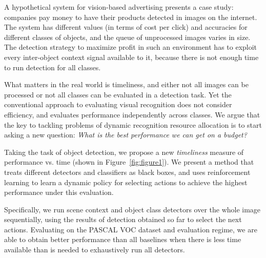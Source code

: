 A hypothetical system for vision-based advertising presents a case study: companies pay money to have their products detected in images on the internet.
The system has different values (in terms of cost per click) and accuracies for different classes of objects, and the queue of unprocessed images varies in size.
The detection strategy to maximize profit in such an environment has to exploit every inter-object context signal available to it, because there is not enough time to run detection for all classes.

What matters in the real world is timeliness, and either not all images can be processed or not all classes can be evaluated in a detection task.
Yet the conventional approach to evaluating visual recognition does not consider efficiency, and evaluates performance independently across classes.
We argue that the key to tackling problems of dynamic recognition resource allocation is to start asking a new question:
\emph{What is the best performance we can get on a budget?}

Taking the task of object detection, we propose a new \emph{timeliness} measure of performance vs. time (shown in Figure~\ref{fig:figure1}).
We present a method that treats different detectors and classifiers as black boxes, and uses reinforcement learning to learn a dynamic policy for selecting actions to achieve the highest performance under this evaluation.

Specifically, we run scene context and object class detectors over the whole image sequentially, using the results of detection obtained so far to select the next actions.
Evaluating on the PASCAL VOC dataset and evaluation regime, we are able to obtain better performance than all baselines when there is less time available than is needed to exhaustively run all detectors.

